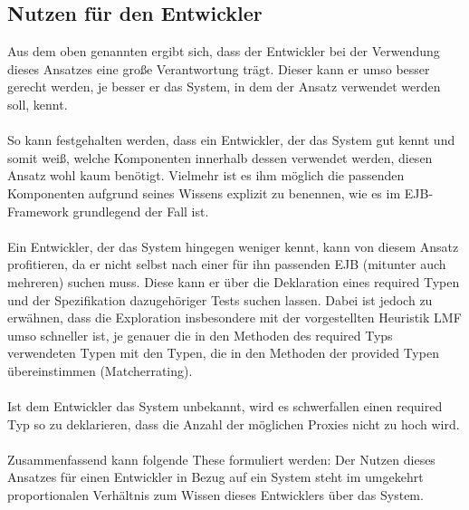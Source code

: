 \subsection{Nutzen für den Entwickler}
Aus dem oben genannten ergibt sich, dass der Entwickler bei der Verwendung dieses Ansatzes eine große Verantwortung trägt. Dieser kann er umso besser gerecht werden, je besser er das System, in dem der Ansatz verwendet werden soll, kennt. 
\\\\
So kann festgehalten werden, dass ein Entwickler, der das System gut kennt und somit weiß, welche Komponenten innerhalb dessen verwendet werden, diesen Ansatz wohl kaum benötigt. Vielmehr ist es ihm möglich die passenden Komponenten aufgrund seines Wissens explizit zu benennen, wie es im EJB-Framework grundlegend der Fall ist.
\\\\
Ein Entwickler, der das System hingegen weniger kennt, kann von diesem Ansatz profitieren, da er nicht selbst nach einer für ihn passenden EJB (mitunter auch mehreren) suchen muss. Diese kann er über die Deklaration eines required Typen und der Spezifikation dazugehöriger Tests suchen lassen. Dabei ist jedoch zu erwähnen, dass die Exploration insbesondere mit der vorgestellten Heuristik LMF umso schneller ist, je genauer die in den Methoden des required Typs verwendeten Typen mit den Typen, die in den Methoden der provided Typen übereinstimmen (Matcherrating).
\\\\
Ist dem Entwickler das System unbekannt, wird es schwerfallen einen required Typ so zu deklarieren, dass die Anzahl der möglichen Proxies nicht zu hoch wird. 
\\\\
Zusammenfassend kann folgende These formuliert werden: Der Nutzen dieses Ansatzes für einen Entwickler in Bezug auf ein System steht im umgekehrt proportionalen Verhältnis zum Wissen dieses Entwicklers über das System. 

